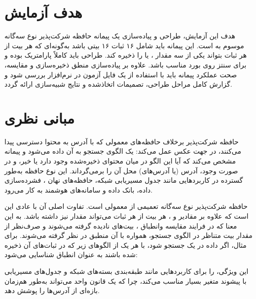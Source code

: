 \documentclass[11pt,a4paper]{article}
\begin{document}
\section{هدف آزمایش}
هدف این آزمایش، طراحی و پیاده‌سازی یک پیمانه حافظه شرکت‌پذیر نوع سه‌گانه
 موسوم به  است. این پیمانه
باید شامل ۱۶ ثبات ۱۶ بیتی باشد به‌گونه‌ای که هر بیت از هر ثبات بتواند یکی از
سه مقدار ،  یا   را ذخیره
کند. طراحی باید کاملاً پارامتریک بوده و برای سنتز روی بورد  مناسب
باشد. علاوه بر پیاده‌سازی منطق ذخیره‌سازی و مقایسه، صحت عملکرد پیمانه باید
با استفاده از یک فایل آزمون  در نرم‌افزار 
بررسی شود و گزارش کامل مراحل طراحی، تصمیمات اتخاذشده و نتایج شبیه‌سازی ارائه
گردد.

\section{مبانی نظری}

حافظه شرکت‌پذیر  
برخلاف حافظه‌های معمولی که با آدرس به محتوا دسترسی پیدا می‌کنند، در جهت
عکس عمل می‌کند: یک الگوی جستجو به آن داده می‌شود و پیمانه مشخص می‌کند که
آیا این الگو در میان محتوای ذخیره‌شده وجود دارد یا خیر، و در صورت وجود،
آدرس (یا آدرس‌های) محل آن را برمی‌گرداند. این نوع حافظه به‌طور گسترده در
کاربردهایی مانند جدول مسیریابی شبکه، حافظه‌های نهان ، فشرده‌سازی
داده، بانک داده و سامانه‌های هوشمند به کار می‌رود.

حافظه شرکت‌پذیر نوع سه‌گانه 
تعمیمی از  معمولی است. تفاوت اصلی آن با  عادی این است که
علاوه بر مقادیر  و ، هر بیت از هر ثبات می‌تواند مقدار  نیز داشته باشد. به این معنا که در فرایند مقایسه وانطباق ،
بیت‌های  نادیده گرفته می‌شوند و صرف‌نظر از مقدار بیت متناظر در الگوی
جستجو، همواره با آن منطبق در نظر گرفته می‌شوند. برای مثال، اگر داده
 در یک  جستجو شود، با هر یک از الگوهای زیر که در
ثبات‌های آن ذخیره شده باشند به عنوان انطباق شناسایی می‌شود:
\begin{center}
 \quad {} \quad {} \quad {}
\end{center}
این ویژگی،  را برای کاربردهایی مانند طبقه‌بندی بسته‌های شبکه و
جدول‌های مسیریابی با پیشوند متغیر  بسیار مناسب
می‌کند، چرا که یک قانون واحد می‌تواند به‌طور هم‌زمان بازه‌ای از آدرس‌ها را
پوشش دهد.
\end{document}
